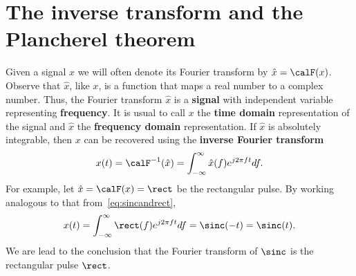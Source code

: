 \documentclass[11pt,a4paper]{book}
\theoremstyle{plain}
\numberwithin{equation}{section}
\newcommand{\term}{\textbf}
\begin{document}
\section{The inverse transform and the Plancherel theorem}\label{sec:square-integr-sign}

Given a signal $x$ we will often denote its Fourier transform by $\hat{x} = \calF(x)$.  Observe that $\hat{x}$, like $x$, is a function that maps a real number to a complex number.  Thus, the Fourier transform $\hat{x}$ is a \term{signal} with independent variable representing \term{frequency}.  It is usual to call $x$ the \term{time domain} representation of the signal and $\hat{x}$ the \term{frequency domain} representation.  If $\hat{x}$ is absolutely integrable, then $x$ can be recovered using the \term{inverse Fourier transform}
\begin{equation}\label{eq:inversefouriertransform}
x(t) = \calF^{-1}(\hat{x}) =  \int_{-\infty}^\infty \hat{x}(f) e^{j2\pi ft} df.
\end{equation}
For example, let $\hat{x} = \calF(x) = \rect$ be the rectangular pulse.  By working analogous to that from~\eqref{eq:sincandrect},
\[
x(t) = \int_{-\infty}^\infty \rect(f) e^{j2\pi ft} df = \sinc(-t) = \sinc(t).
\]
We are lead to the conclusion that the Fourier transform of $\sinc$ is the rectangular pulse $\rect$.
\end{document}
